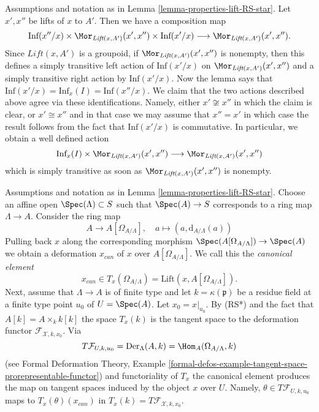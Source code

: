 \begin{remark}[Automorphisms]
\label{remark-automorphisms}
Assumptions and notation as in Lemma \ref{lemma-properties-lift-RS-star}.
Let $x', x''$ be lifts of $x$ to $A'$. Then we have a composition
map
$$
\text{Inf}(x''/x) \times
\Mor_{\textit{Lift}(x, A')}(x', x'') \times \text{Inf}(x'/x)
\longrightarrow
\Mor_{\textit{Lift}(x, A')}(x', x'').
$$
Since $\textit{Lift}(x, A')$ is a groupoid, if
$\Mor_{\textit{Lift}(x, A')}(x', x'')$ is nonempty, then this defines
a simply transitive left action of $\text{Inf}(x'/x)$ on
$\Mor_{\textit{Lift}(x, A')}(x', x'')$ and a simply transitive
right action by $\text{Inf}(x'/x)$. Now the lemma says that
$\text{Inf}(x'/x) = \text{Inf}_x(I) = \text{Inf}(x''/x)$.
We claim that the two actions described above agree via these identifications.
Namely, either $x' \not \cong x''$ in which the claim is clear, or
$x' \cong x''$ and in that case we may assume that $x'' = x'$ in which
case the result follows from the fact that $\text{Inf}(x'/x)$ is
commutative. In particular, we obtain a well defined action
$$
\text{Inf}_x(I) \times \Mor_{\textit{Lift}(x, A')}(x', x'')
\longrightarrow
\Mor_{\textit{Lift}(x, A')}(x', x'')
$$
which is simply transitive as soon as $\Mor_{\textit{Lift}(x, A')}(x', x'')$
is nonempty.
\end{remark}

\begin{remark}
\label{remark-canonical-element}
Assumptions and notation as in Lemma \ref{lemma-properties-lift-RS-star}.
Choose an affine open $\Spec(\Lambda) \subset S$ such that $\Spec(A) \to S$
corresponds to a ring map $\Lambda \to A$. Consider the ring map
$$
A \longrightarrow A[\Omega_{A/\Lambda}],
\quad
a \longmapsto (a, \text{d}_{A/\Lambda}(a))
$$
Pulling back $x$ along the corresponding morphism
$\Spec(A[\Omega_{A/\Lambda}]) \to \Spec(A)$ we obtain a
deformation $x_{can}$ of $x$ over $A[\Omega_{A/\Lambda}]$. We call this
the {\it canonical element}
$$
x_{can} \in T_x(\Omega_{A/\Lambda}) = \text{Lift}(x, A[\Omega_{A/\Lambda}]).
$$
Next, assume that $\Lambda \to A$ is of finite type and let
$k = \kappa(\mathfrak p)$ be a residue field at a finite type point $u_0$
of $U = \Spec(A)$. Let $x_0 = x|_{u_0}$. By (RS*) and the fact that
$A[k] = A \times_k k[k]$ the space $T_x(k)$ is the tangent space to the
deformation functor $\mathcal{F}_{\mathcal{X}, k, x_0}$. Via
$$
T\mathcal{F}_{U, k, u_0} =
\text{Der}_\Lambda(A, k) = \Hom_A(\Omega_{A/\Lambda}, k)
$$
(see Formal Deformation Theory, Example
\ref{formal-defos-example-tangent-space-prorepresentable-functor})
and functoriality of $T_x$ the canonical element produces the map
on tangent spaces induced by the object $x$ over $U$. Namely,
$\theta \in T\mathcal{F}_{U, k, u_0}$ maps to $T_x(\theta)(x_{can})$
in $T_x(k) = T\mathcal{F}_{\mathcal{X}, k, x_0}$.
\end{remark}


